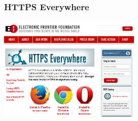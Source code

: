 \begin{frame}
  \frametitle{HTTPS Everywhere}
    \begin{center}
      \includegraphics[height=5cm]{../../img/https-everywhere.png}
    \end{center}
\end{frame}
